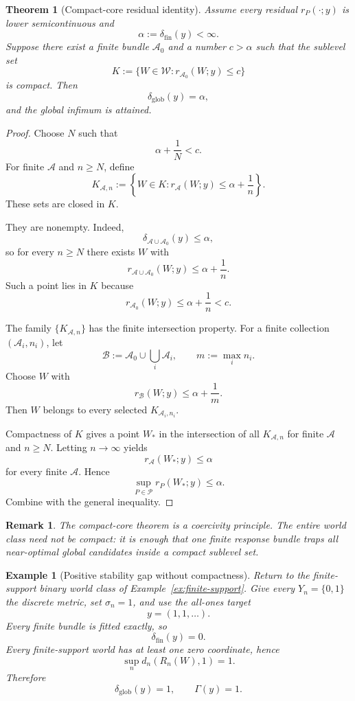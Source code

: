\documentclass[11pt]{article}
\newtheorem{theorem}[definition]{Theorem}
\newtheorem{example}[definition]{Example}
\newtheorem{remark}[definition]{Remark}
\newcommand{\W}{\mathcal W}
\newcommand{\Pcal}{\mathcal P}
\newcommand{\Acal}{\mathcal A}
\newcommand{\Bcal}{\mathcal B}
\begin{document}
\begin{theorem}[Compact-core residual identity]
\label{thm:compact-core}
Assume every residual $r_P(\cdot;y)$ is lower semicontinuous and
\[
\alpha:=\delta_{\mathrm{fin}}(y)<\infty.
\]
Suppose there exist a finite bundle $\Acal_0$ and a number $c>\alpha$ such
that the sublevel set
\[
K
:=
\{W\in\W:r_{\Acal_0}(W;y)\le c\}
\]
is compact. Then
\[
\delta_{\mathrm{glob}}(y)=\alpha,
\]
and the global infimum is attained.
\end{theorem}

\begin{proof}
Choose $N$ such that
\[
\alpha+\frac1N<c.
\]
For finite $\Acal$ and $n\ge N$, define
\[
K_{\Acal,n}
:=
\left\{
W\in K:
r_{\Acal}(W;y)\le\alpha+\frac1n
\right\}.
\]
These sets are closed in $K$.

They are nonempty. Indeed,
\[
\delta_{\Acal\cup\Acal_0}(y)\le\alpha,
\]
so for every $n\ge N$ there exists $W$ with
\[
r_{\Acal\cup\Acal_0}(W;y)
\le
\alpha+\frac1n.
\]
Such a point lies in $K$ because
\[
r_{\Acal_0}(W;y)
\le
\alpha+\frac1n
<c.
\]

The family $\{K_{\Acal,n}\}$ has the finite intersection property. For a
finite collection $(\Acal_i,n_i)$, let
\[
\Bcal:=\Acal_0\cup\bigcup_i\Acal_i,
\qquad
m:=\max_i n_i.
\]
Choose $W$ with
\[
r_{\Bcal}(W;y)\le\alpha+\frac1m.
\]
Then $W$ belongs to every selected $K_{\Acal_i,n_i}$.

Compactness of $K$ gives a point $W_\ast$ in the intersection of all
$K_{\Acal,n}$ for finite $\Acal$ and $n\ge N$. Letting $n\to\infty$ yields
\[
r_{\Acal}(W_\ast;y)\le\alpha
\]
for every finite $\Acal$. Hence
\[
\sup_{P\in\Pcal}r_P(W_\ast;y)\le\alpha.
\]
Combine with the general inequality.
\end{proof}

\begin{remark}
The compact-core theorem is a coercivity principle. The entire world class
need not be compact: it is enough that one finite response bundle traps all
near-optimal global candidates inside a compact sublevel set.
\end{remark}

\begin{example}[Positive stability gap without compactness]
Return to the finite-support binary world class of
Example~\ref{ex:finite-support}. Give every $Y_n=\{0,1\}$ the discrete metric,
set $\sigma_n=1$, and use the all-ones target
\[
y=(1,1,\ldots).
\]
Every finite bundle is fitted exactly, so
\[
\delta_{\mathrm{fin}}(y)=0.
\]
Every finite-support world has at least one zero coordinate, hence
\[
\sup_n d_n(R_n(W),1)=1.
\]
Therefore
\[
\delta_{\mathrm{glob}}(y)=1,
\qquad
\Gamma(y)=1.
\]
\end{example}
\end{document}
